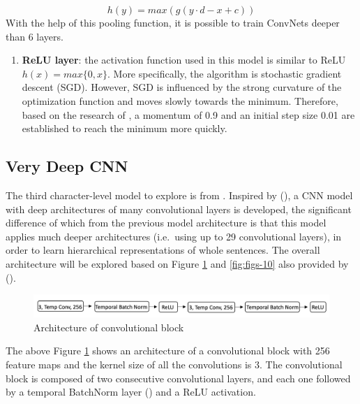 \documentclass[]{krantz}
\providecommand{\tightlist}{%
  \setlength{\itemsep}{0pt}\setlength{\parskip}{0pt}}
\begin{document}
\[h(y)=max (g(y \cdot d -x+c))\]
With the help of this pooling function, it is possible to train ConvNets deeper than 6 layers.

\begin{enumerate}
\def\labelenumi{\arabic{enumi}.}
\setcounter{enumi}{3}
\tightlist
\item
  \textbf{ReLU layer}: the activation function used in this model is similar to ReLU \(h(x)=max\{0,x\}\). More specifically, the algorithm is stochastic gradient descent (SGD). However, SGD is influenced by the strong curvature of the optimization function and moves slowly towards the minimum. Therefore, based on the research of \citet{Sutskever2013OnTI}, a momentum of 0.9 and an initial step size 0.01 are established to reach the minimum more quickly.
\end{enumerate}

\hypertarget{very-deep-cnn}{%
\subsection{Very Deep CNN}\label{very-deep-cnn}}

The third character-level model to explore is from \citet{Schwenk2017VeryDC}. Inspired by (\citet{Simonyan2015VeryDC}), a CNN model with deep architectures of many convolutional layers is developed, the significant difference of which from the previous model architecture is that this model applies much deeper architectures (i.e.~using up to 29 convolutional layers), in order to learn hierarchical representations of whole sentences. The overall architecture will be explored based on Figure \ref{fig:figs-9} and \ref{fig:figs-10} also provided by (\citet{Schwenk2017VeryDC}).

\begin{figure}[ht]

{\centering \includegraphics[width=1\linewidth]{figures/01-03-cnns-and-their-applications-in-nlp/Convolutional_Block} 

}

\caption{\label{fig:fig_9} Architecture of convolutional block}\label{fig:figs-9}
\end{figure}

The above Figure \ref{fig:figs-9} shows an architecture of a convolutional block with 256 feature maps and the kernel size of all the convolutions is 3. The convolutional block is composed of two consecutive convolutional layers, and each one followed by a temporal BatchNorm layer (\citet{Ioffe2015BatchNA}) and a ReLU activation.
\end{document}
